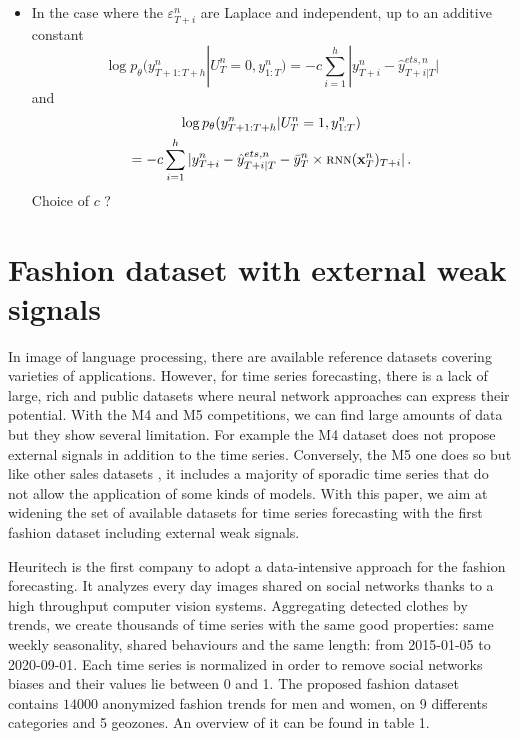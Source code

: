 \documentclass[letterpaper]{article} %
\newcommand{\ts}{y}
\newcommand{\etspred}{\hat{y}}
\newcommand{\meants}{\Bar{\ts}}
\newcommand{\rnnmodel}{\textsc{rnn}}
\newcommand{\concatinput}{x}
\newcommand{\fullconcatinput}{{ \bf \concatinput}}
\newcommand{\numberts}{14000}
\begin{document}
{\begin{itemize}
\begin{multline*}
 = -c\sum_{i=1}^{h}(\ts^n_{T+i}  - \etspred^{ets,n}_{T+i|T} - \meants^n_T\times \rnnmodel(\fullconcatinput^n_T)_{T+i})^2\,.
\end{multline*}
Choice of $c$ ?
\item In the case where the  $\varepsilon^n_{T+i}$ are Laplace and independent, up to an additive constant
$$
\log p_\theta(\ts^n_{T+1:T+h}|U_T^n=0,\ts^n_{1:T}) = -c\sum_{i=1}^{h}|\ts^n_{T+i}  - \etspred^{ets,n}_{T+i|T}|
$$
and
\begin{multline*}
\log p_\theta(\ts^n_{T+1:T+h}|U_T^n=1,\ts^n_{1:T})\\
 = -c\sum_{i=1}^{h}|\ts^n_{T+i}  - \etspred^{ets,n}_{T+i|T} - \meants^n_T\times \rnnmodel(\fullconcatinput^n_T)_{T+i}|\,.
\end{multline*}
Choice of $c$ ?
\end{itemize}}

\section{Fashion dataset with external weak signals}
\label{sec:dataset}
In image of language processing, there are available reference datasets covering varieties of applications. However, for time series forecasting, there is a lack of large, rich and public datasets where neural network approaches can express their potential. With the M4 and M5 competitions, we can find large amounts of data but they show several limitation. For example the M4 dataset does not propose external signals in addition to the time series. Conversely, the M5 one does so but like other sales datasets \citep{C.Favorita}, it includes a majority of sporadic time series that do not allow the application of some kinds of models\citep{makridakis2020m5}. With this paper, we aim at widening the set of available datasets for time series forecasting with the first fashion dataset including external weak signals.

Heuritech is the first company to adopt a data-intensive approach  for the fashion forecasting. It analyzes every day images shared on social networks thanks to a high throughput computer vision systems. Aggregating detected clothes by trends, we create thousands of time series with the same good properties: same weekly seasonality, shared behaviours and the same length: from 2015-01-05 to 2020-09-01. Each time series is normalized in order to remove social networks biases and their values lie between 0 and 1. The proposed fashion dataset contains $\numberts$ anonymized fashion trends for men and women, on 9 differents categories and 5 geozones. An overview of it can be found in table 1.
\end{document}

